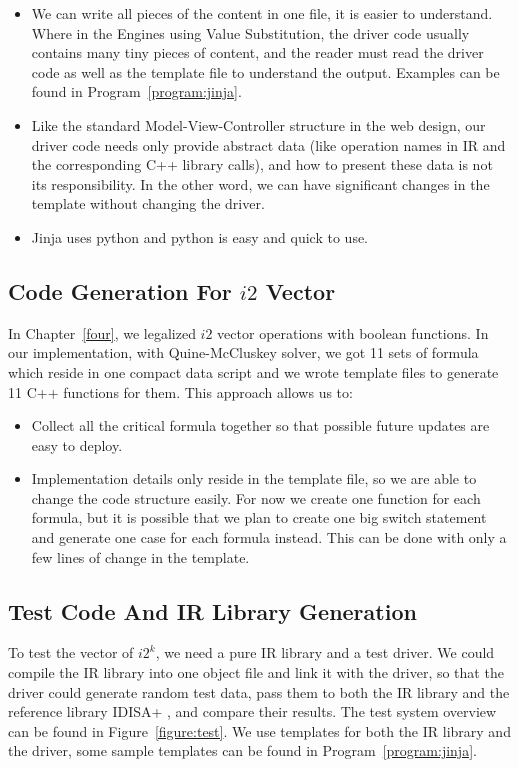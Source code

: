\begin{itemize}
    \item We can write all pieces of the content in one file, it is easier to understand. Where in the Engines using Value Substitution, the driver code usually contains many tiny pieces of content, and the reader must read the driver code as well as the template file to understand the output. Examples can be found in Program~\ref{program:jinja}.
    \item Like the standard Model-View-Controller structure in the web design, our driver code needs only provide abstract data (like operation names in IR and the corresponding C++ library calls), and how to present these data is not its responsibility. In the other word, we can have significant changes in the template without changing the driver.
    \item Jinja uses python and python is easy and quick to use.
\end{itemize}

\subsection{Code Generation For $i2$ Vector}
In Chapter~\ref{four}, we legalized $i2$ vector operations with boolean functions. In our implementation, with Quine-McCluskey solver, we got 11 sets of formula which reside in one compact data script and we wrote template files to generate 11 C++ functions for them. This approach allows us to:
\begin{itemize}
    \item Collect all the critical formula together so that possible future updates are easy to deploy.
    \item Implementation details only reside in the template file, so we are able to change the code structure easily. For now we create one function for each formula, but it is possible that we plan to create one big switch statement and generate one case for each formula instead. This can be done with only a few lines of change in the template.
\end{itemize}

\subsection{Test Code And IR Library Generation}
To test the vector of $i2^k$, we need a pure IR library and a test driver. We could compile the IR library into one object file and link it with the driver, so that the driver could generate random test data, pass them to both the IR library and the reference library IDISA+ \cite{hua_idisa}, and compare their results. The test system overview can be found in Figure~\ref{figure:test}. We use templates for both the IR library and the driver, some sample templates can be found in Program~\ref{program:jinja}.

